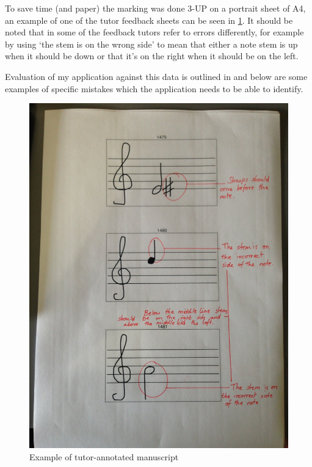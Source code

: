 To save time (and paper) the marking was done 3-UP on a portrait sheet of A4, an example of one of the tutor feedback sheets can be seen in \cref{fig:teacher-sheet}. It should be noted that in some of the feedback tutors refer to errors differently, for example by using `the stem is on the wrong side' to mean that either a note stem is up when it should be down or that it's on the right when it should be on the left.

Evaluation of my application against this data is outlined in  and below are some examples of specific mistakes which the application needs to be able to identify.

\begin{figure}[H]
  \centering
  \includegraphics[width=\linewidth]{gfx/photos/teacher-sheet-1.jpg}
  \caption{Example of tutor-annotated manuscript}
  \label{fig:teacher-sheet}
\end{figure}


